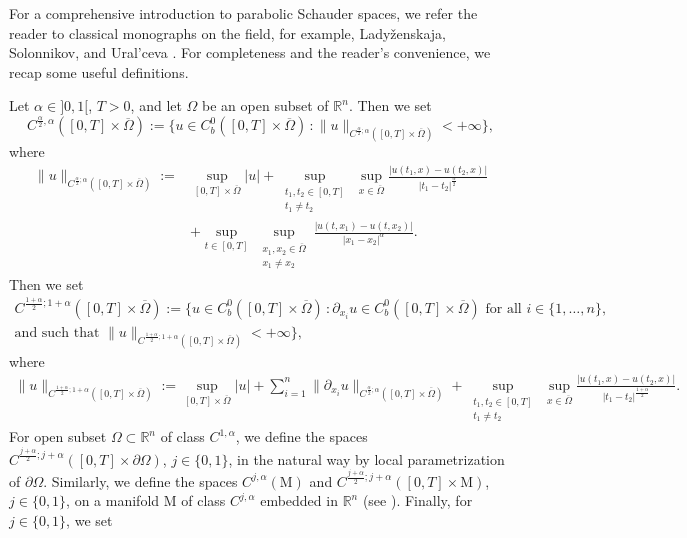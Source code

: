 \documentclass[11pt,reqno,a4paper]{amsart}
\theoremstyle{plain}
\theoremstyle{definition}
\begin{document}
For a comprehensive introduction to parabolic Schauder spaces, we refer the reader to classical monographs on the field, for example, Lady\v{z}enskaja, Solonnikov, and Ural'ceva
\cite[Ch.\,1]{LaSoUr68}. For completeness and the reader's convenience, we recap some useful definitions.

Let $\alpha \in ]0,1[$, $T>0$, and let $\Omega$ be an open subset of $\mathbb{R}^n$. Then we set 
\begin{equation*}
    C^{\frac{\alpha}{2},\alpha}([0, T] \times \overline{\Omega}) := \Big\{ u \in C^{0}_{b}([0, T] \times \overline{\Omega}) \, \colon \|u\|_{C^{\frac{\alpha}{2};\alpha}([0, T] \times \overline{\Omega})} < +\infty \Big\},
\end{equation*}
where
\begin{align*}
    \|u\|_{C^{\frac{\alpha}{2};\alpha}([0, T] \times \overline{\Omega})} :=& \sup_{[0, T] \times \overline{\Omega}} |u| + \sup_{\substack{t_1,t_2 \in [0,T] \\ t_1 \neq t_2}} \,\sup_{x \in \overline{\Omega}} \frac{|u(t_1,x) - u(t_2,x)|}{|t_1-t_2|^\frac{\alpha}{2}}
    \\
    & + \sup_{t \in [0,T]} \,\sup_{\substack{x_1,x_2 \in \overline{\Omega} \\ x_1 \neq x_2}} \frac{|u(t,x_1) - u(t,x_2)|}{|x_1-x_2|^\alpha} .
\end{align*}
Then we set
\begin{align*}
    C^{\frac{1+\alpha}{2}; 1+\alpha}([0, T] \times \overline{\Omega}) := \Big\{ u \in C^{0}_{b}([0, T] \times \overline{\Omega}) \, \colon \partial_{x_i} u \in C^{0}_b([0, T] \times \overline{\Omega}) \text{ for all } i \in \{1,\dots,n\}, 
    \\
    \text{and such that }
    \|u\|_{C^{\frac{1+\alpha}{2}; 1+\alpha}([0, T] \times \overline{\Omega})}
    < +\infty \Big\},
\end{align*}
where
\begin{align*}
    \|u\|_{C^{\frac{1+\alpha}{2}; 1+\alpha}([0, T] \times \overline{\Omega})} := \sup_{[0, T] \times \overline{\Omega}} |u| + \sum_{i=1}^{n} \|\partial_{x_i} u\|_{C^{\frac{\alpha}{2}; \alpha}([0, T] \times \overline{\Omega})} 
     + \sup_{\substack{t_1,t_2 \in [0,T] \\ t_1 \neq t_2}} \,\sup_{x \in \overline{\Omega}} \frac{|u(t_1,x) - u(t_2,x)|}{|t_1-t_2|^{\frac{1+\alpha}{2}}} .
\end{align*}
For open subset $\Omega \subset \mathbb{R}^n $ of class $C^{1,\alpha}$, we define the spaces
$C^{\frac{j+\alpha}{2}; j+\alpha}([0, T] \times \partial \Omega)$, $j \in \{0,1\}$, in the natural way by local parametrization of $\partial \Omega$. Similarly, we define the spaces $C^{j,\alpha}(\mathrm{M})$ and $C^{\frac{j+\alpha}{2}; j+\alpha}([0, T] \times \mathrm{M})$, $j \in \{0,1\}$, on a manifold $\mathrm{M}$ of class $C^{j,\alpha}$ embedded in $\mathbb{R}^n$ (see \cite[App.\,A]{DaLu23}). Finally, for $j \in \{0,1\}$, we set
\end{document}
